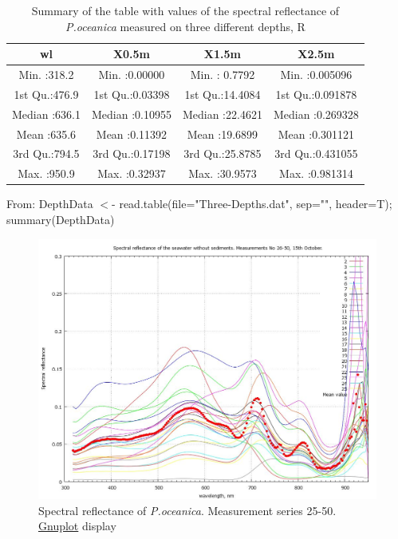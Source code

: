 \documentclass[11pt]{article}
\begin{document}
\begin{appendices}
\begin{table}[H]
\end{table}
\pagebreak

\begin{table}[htbp]
	\caption{Summary of the table with values of the spectral reflectance of \textit{P.oceanica} measured on three different depths, R}
	\begin{center}
	\begin{tabular}{|c|c|c|c|}
		\hline\hline
		wl & X0.5m & X1.5m & X2.5m\\ \hline\hline
		Min.   :318.2   &  Min.   :0.00000     &   Min.   : 0.7792     &   Min.   :0.005096  \\ \hline
		 1st Qu.:476.9   &  1st Qu.:0.03398    &  1st Qu.:14.4084    &  1st Qu.:0.091878  \\ \hline
		 Median :636.1   &   Median :0.10955    &  Median :22.4621   &  Median :0.269328 \\ \hline 
		 Mean   :635.6   &   Mean   :0.11392   &   Mean   :19.6899   &  Mean   :0.301121  \\ \hline
		 3rd Qu.:794.5   &   3rd Qu.:0.17198   &   3rd Qu.:25.8785    &  3rd Qu.:0.431055 \\ \hline  
		 Max.   :950.9     &  Max.   :0.32937    &  Max.   :30.9573   &   Max.   :0.981314  \\ \hline
	\end{tabular}
	\end{center}
		From: DepthData $<$- read.table(file="Three-Depths.dat", sep="", header=T); summary(DepthData)
	\label{tab:17}
\end{table}

\begin{figure}[H]
	\begin{center}
		\includegraphics[scale=0.25]{GNU-11.jpg}
		\caption{Spectral reflectance of \textit{P.oceanica}. Measurement series 25-50. \\ \href{http://www.gnuplot.info/}{Gnuplot} display­}
		\label{fig:A.25}
	\end{center}
\end{figure}
\pagebreak


\end{appendices}
\end{document}
